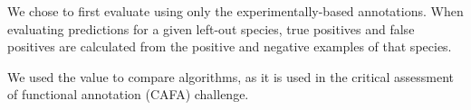 We chose to first evaluate using only the experimentally-based annotations. 
When evaluating predictions for a given left-out species, true positives and false positives are calculated from the positive and negative examples of that species.

We used the \fmax value to compare algorithms, as it is used in the critical assessment of functional annotation (CAFA) challenge. 
